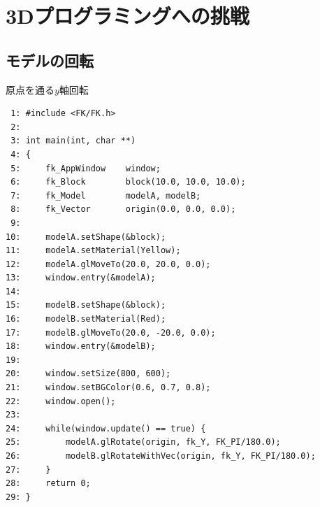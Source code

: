 ﻿\chapter{3Dプログラミングへの挑戦}
\section{モデルの回転} \label{sec:06-rotate}
\begin{itembox}[l]{原点を通る\(y\)軸回転}
\begin{verbatim}
 1: #include <FK/FK.h>
 2: 
 3: int main(int, char **)
 4: {
 5:     fk_AppWindow    window;
 6:     fk_Block        block(10.0, 10.0, 10.0);
 7:     fk_Model        modelA, modelB;
 8:     fk_Vector       origin(0.0, 0.0, 0.0);
 9: 
10:     modelA.setShape(&block);
11:     modelA.setMaterial(Yellow);
12:     modelA.glMoveTo(20.0, 20.0, 0.0);
13:     window.entry(&modelA);
14: 
15:     modelB.setShape(&block);
16:     modelB.setMaterial(Red);
17:     modelB.glMoveTo(20.0, -20.0, 0.0);
18:     window.entry(&modelB);
19: 
20:     window.setSize(800, 600);
21:     window.setBGColor(0.6, 0.7, 0.8);
22:     window.open();
23: 
24:     while(window.update() == true) {
25:         modelA.glRotate(origin, fk_Y, FK_PI/180.0);
26:         modelB.glRotateWithVec(origin, fk_Y, FK_PI/180.0);
27:     }
28:     return 0;
29: }
\end{verbatim}
\end{itembox}
